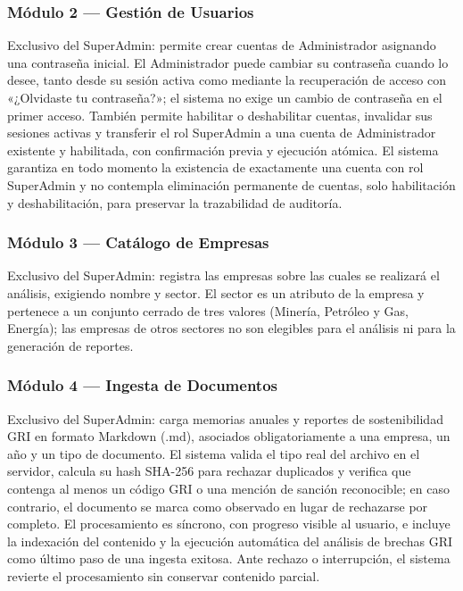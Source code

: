 \subsubsection{Módulo 2 --- Gestión de Usuarios}
Exclusivo del SuperAdmin: permite crear cuentas de Administrador asignando una contraseña inicial. El Administrador puede cambiar su contraseña cuando lo desee, tanto desde su sesión activa como mediante la recuperación de acceso con «¿Olvidaste tu contraseña?»; el sistema no exige un cambio de contraseña en el primer acceso. También permite habilitar o deshabilitar cuentas, invalidar sus sesiones activas y transferir el rol SuperAdmin a una cuenta de Administrador existente y habilitada, con confirmación previa y ejecución atómica. El sistema garantiza en todo momento la existencia de exactamente una cuenta con rol SuperAdmin y no contempla eliminación permanente de cuentas, solo habilitación y deshabilitación, para preservar la trazabilidad de auditoría.

\subsubsection{Módulo 3 --- Catálogo de Empresas}
Exclusivo del SuperAdmin: registra las empresas sobre las cuales se realizará el análisis, exigiendo nombre y sector. El sector es un atributo de la empresa y pertenece a un conjunto cerrado de tres valores (Minería, Petróleo y Gas, Energía); las empresas de otros sectores no son elegibles para el análisis ni para la generación de reportes.

\subsubsection{Módulo 4 --- Ingesta de Documentos}
Exclusivo del SuperAdmin: carga memorias anuales y reportes de sostenibilidad GRI en formato Markdown (.md), asociados obligatoriamente a una empresa, un año y un tipo de documento. El sistema valida el tipo real del archivo en el servidor, calcula su hash SHA-256 para rechazar duplicados y verifica que contenga al menos un código GRI o una mención de sanción reconocible; en caso contrario, el documento se marca como observado en lugar de rechazarse por completo. El procesamiento es síncrono, con progreso visible al usuario, e incluye la indexación del contenido y la ejecución automática del análisis de brechas GRI como último paso de una ingesta exitosa. Ante rechazo o interrupción, el sistema revierte el procesamiento sin conservar contenido parcial.

